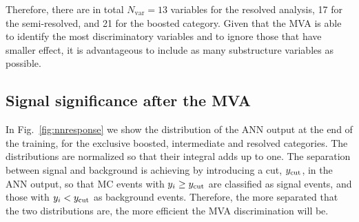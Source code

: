 %
Therefore, there are in total $N_{\mathrm{var}}=13$ variables for the resolved analysis,
17 for the semi-resolved, and 21 for the boosted category.
%
Given that the MVA is able to identify the most discriminatory variables
and to ignore those that have smaller effect, it is advantageous to
include as many substructure variables as possible.
%

\subsection{Signal significance after the MVA}

In Fig.~\ref{fig:nnresponse} we show the distribution of
the ANN output at the end of the training, for the exclusive
boosted, intermediate and resolved categories.
%
The distributions are normalized so that their integral
  adds up to one.
%
The  separation between signal and background is achieving by introducing
a cut, $y_{\rm cut}$, in the ANN output, so that MC events with $y_i\ge
y_{\rm cut}$ are classified as signal events, and those with
 $y_i <
y_{\rm cut}$ as background events.
%
Therefore,
the more separated that the two distributions are, the more efficient
the MVA discrimination will be.



